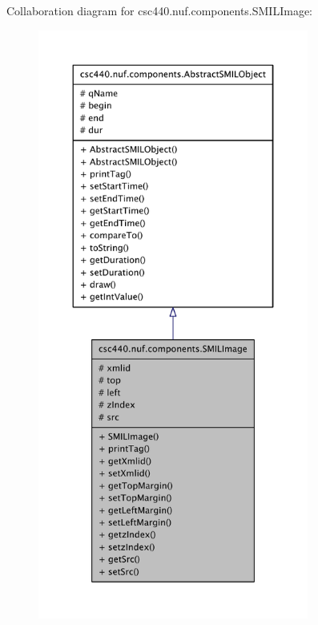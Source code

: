 Collaboration diagram for csc440.\-nuf.\-components.\-S\-M\-I\-L\-Image\-:
\nopagebreak
\begin{figure}[H]
\begin{center}
\leavevmode
\includegraphics[height=550pt]{classcsc440_1_1nuf_1_1components_1_1_s_m_i_l_image__coll__graph}
\end{center}
\end{figure}
